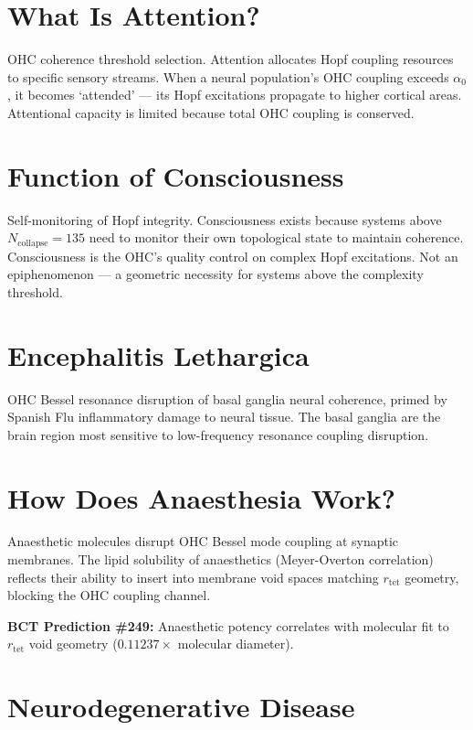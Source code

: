 \documentclass[aps,prl,twocolumn,superscriptaddress]{revtex4-2}
\begin{document}
\section{What Is Attention?}

OHC coherence threshold selection. Attention allocates Hopf coupling resources to specific sensory streams. When a neural population's OHC coupling exceeds $\alpha_0$, it becomes `attended' --- its Hopf excitations propagate to higher cortical areas. Attentional capacity is limited because total OHC coupling is conserved.

\section{Function of Consciousness}

Self-monitoring of Hopf integrity. Consciousness exists because systems above $N_{\mathrm{collapse}} = 135$ need to monitor their own topological state to maintain coherence. Consciousness is the OHC's quality control on complex Hopf excitations. Not an epiphenomenon --- a geometric necessity for systems above the complexity threshold.

\section{Encephalitis Lethargica}

OHC Bessel resonance disruption of basal ganglia neural coherence, primed by Spanish Flu inflammatory damage to neural tissue. The basal ganglia are the brain region most sensitive to low-frequency resonance coupling disruption.

\section{How Does Anaesthesia Work?}

Anaesthetic molecules disrupt OHC Bessel mode coupling at synaptic membranes. The lipid solubility of anaesthetics (Meyer-Overton correlation) reflects their ability to insert into membrane void spaces matching $r_{\mathrm{tet}}$ geometry, blocking the OHC coupling channel.

\textbf{BCT Prediction \#249:} Anaesthetic potency correlates with molecular fit to $r_{\mathrm{tet}}$ void geometry ($0.11237 \times$ molecular diameter).

\section{Neurodegenerative Disease}
\end{document}
